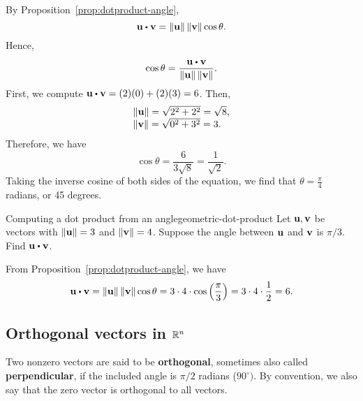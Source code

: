 \begin{solution}
  By Proposition~\ref{prop:dotproduct-angle},
  \begin{equation*}
    \vect{u}\dotprod \vect{v}=\norm{\vect{u}} \norm{\vect{v}} \cos \theta.
  \end{equation*}
  Hence, 
  \begin{equation*}
    \cos \theta =\frac{\vect{u}\dotprod \vect{v}}{\norm{\vect{u}}\norm{\vect{v}}}.
  \end{equation*}
  First, we compute $\vect{u}\dotprod \vect{v} = (2)(0) + (2)(3) = 6$.
  Then, 
  \begin{equation*}
    \begin{array}{l}
      \left\|\mbox{\bf u}\right\| = \sqrt{2^2+2^2}=\sqrt{8},\\
      \left\|\mbox{\bf v}\right\| = \sqrt{0^2+3^2}=3.
    \end{array}
  \end{equation*}
  Therefore, we have
  \begin{equation*}
    \cos \theta =\frac{6}{3\sqrt{8}} = \frac{1}{\sqrt{2}}.
  \end{equation*}
  Taking the inverse cosine of both sides of the equation, we find
  that $\theta =\frac{\pi}{4}$ radians, or 45 degrees.
\end{solution}

\begin{example}{Computing a dot product from an angle}{geometric-dot-product}
  Let $\mbox{\bf u},\mbox{\bf v}$ be vectors with $ \left\|\mbox{\bf u}\right\| = 3$ and $\left\|\mbox{\bf v}\right\| = 4$. 
  Suppose the angle between $\mbox{\bf u}$ and $\mbox{\bf v}$ is $\pi / 3$. Find $\vect{u}\dotprod \vect{v}$.
\end{example}

\begin{solution}
  From Proposition~\ref{prop:dotproduct-angle}, we have
  \begin{equation*}
    \vect{u}\dotprod \vect{v}
    =\norm{\vect{u}} \norm{\vect{v}} \cos \theta
    =3\cdot 4\cdot \cos\tup{\frac{\pi}{3}}
    =3\cdot 4\cdot \frac{1}{2}=6.
\end{equation*}
\end{solution}

\subsection{Orthogonal vectors in $\mathbb{R}^n$}

Two nonzero vectors are said to be
\textbf{orthogonal},
sometimes also called
\textbf{perpendicular},
if the included angle is $\pi /2$ radians ($90^{\circ })$. By
convention, we also say that the zero vector is orthogonal to all
vectors.

